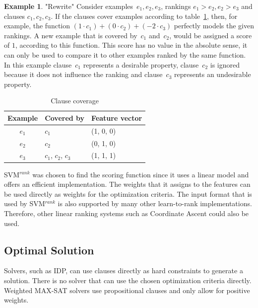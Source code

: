 \documentclass[letterpaper]{article}
\newcommand{\svm}{SVM$^{rank}$}
\theoremstyle{definition}
\newtheorem{example}{Example}
\begin{document}
\begin{example} "Rewrite"
  Consider examples~$e_1, e_2, e_3$, rankings $e_1 > e_2, e_2 > e_3$ and clauses $c_1, c_2, c_3$.
  If the clauses cover examples according to table~\ref{tbl:cover_examples}, then, for example, the function $(1 \cdot c_1) + (0\cdot c_2) + (-2\cdot c_3)$ perfectly models the given rankings.
  A new example that is covered by~$c_1$ and~$c_2$, would be assigned a score of $1$, according to this function.
  This score has no value in the absolute sense, it can only be used to compare it to other examples ranked by the same function.
  In this example clause~$c_1$ represents a desirable property, clause~$c_2$ is ignored because it does not influence the ranking and clause~$c_3$ represents an undesirable property.

  \begin{table}
  \caption{Clause coverage}
  \label{tbl:cover_examples}
  \begin{tabularx}{\linewidth}{c|l|X}
    \textbf{Example} & \textbf{Covered by} & \textbf{Feature vector}\\
    \toprule
    $e_1$             & $c_1$               & (1, 0, 0) \\
    $e_2$             & $c_2$               & (0, 1, 0) \\
    $e_3$             & $c_1$, $c_2$, $c_3$ & (1, 1, 1) \\
  \end{tabularx}
  \end{table}
\end{example}

\svm{} \cite{joachims2006training} was chosen to find the scoring function since it uses a linear model and offers an efficient implementation.
The weights that it assigns to the features can be used directly as weights for the optimization criteria.
The input format that is used by \svm{} is also supported by many other learn-to-rank implementations.
Therefore, other linear ranking systems such as Coordinate Ascent \cite{metzler2007linear} could also be used.

\subsection{Optimal Solution}
Solvers, such as IDP, can use clauses directly as hard constraints to generate a solution.
There is no solver that can use the chosen optimization criteria directly.
Weighted MAX-SAT solvers use propositional clauses and only allow for positive weights.
\end{document}
